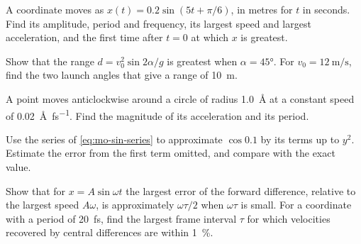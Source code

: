 \begin{exercise}[a sinusoid]
\label{ex:mo-sinusoid}
A coordinate moves as $x(t) = 0.2\sin(5t + \pi/6)$, in metres for $t$ in
seconds. Find its amplitude, period and frequency, its largest speed and
largest acceleration, and the first time after $t = 0$ at which $x$ is
greatest.
\end{exercise}

\begin{exercise}[range]
\label{ex:mo-range}
Show that the range $d = v_0^2\sin2\alpha/g$ is greatest when $\alpha =
\ang{45}$. For $v_0 = \SI{12}{\metre\per\second}$, find the two launch
angles that give a range of \SI{10}{\metre}.
\end{exercise}

\begin{exercise}[an orbit]
\label{ex:mo-orbit}
A point moves anticlockwise around a circle of radius \SI{1.0}{\angstrom}
at a constant speed of \SI{0.02}{\angstrom\per\femto\second}. Find the
magnitude of its acceleration and its period.
\end{exercise}

\begin{exercise}
\label{ex:mo-taylor}
Use the series of \cref{eq:mo-sin-series} to approximate $\cos 0.1$ by
its terms up to $y^2$. Estimate the error from the first term omitted,
and compare with the exact value.
\end{exercise}

\begin{exercise}[sampling]
\label{ex:mo-sampling}
Show that for $x = A\sin\omega t$ the largest error of the forward
difference, relative to the largest speed $A\omega$, is approximately
$\omega\tau/2$ when $\omega\tau$ is small. For a coordinate with a period
of \SI{20}{\femto\second}, find the largest frame interval $\tau$ for which
velocities recovered by central differences are within \SI{1}{\percent}.
\end{exercise}
